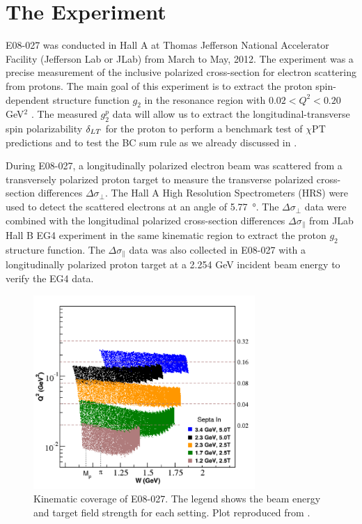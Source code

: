 
\chapter{The Experiment}
\label{C5}

E08-027 was conducted in Hall A at Thomas Jefferson National Accelerator Facility (Jefferson Lab or JLab) from March to May, 2012. The experiment was a precise measurement of the inclusive polarized cross-section for electron scattering from protons. The main goal of this experiment is to extract the proton spin-dependent structure function $g_2$ in the resonance region with $0.02<Q^2<0.20$ GeV${}^2$ \cite{G2P}. The measured $g_2^p$ data will allow us to extract the longitudinal-transverse spin polarizability $\delta_{LT}$ for the proton to perform a benchmark test of $\chi$PT predictions and to test the BC sum rule as we already discussed in .

During E08-027, a longitudinally polarized electron beam was scattered from a transversely polarized proton target to measure the transverse polarized cross-section differences $\Delta\sigma_\perp$. The Hall A High Resolution Spectrometers (HRS) were used to detect the scattered electrons at an angle of \SI{5.77}{\degree}. The $\Delta\sigma_\perp$ data were combined with the longitudinal polarized cross-section differences $\Delta\sigma_\parallel$ from JLab Hall B EG4 experiment \cite{EG4} in the same kinematic region to extract the proton $g_2$ structure function. The $\Delta\sigma_\parallel$ data was also collected in E08-027 with a longitudinally polarized proton target at a 2.254 GeV incident beam energy to verify the EG4 data.

\begin{figure}[tb!]
  \centering
  \includegraphics[width=0.75\textwidth]{figs/kinematics-g2p.png}
  \caption[Kinematic coverage of E08-027.]{Kinematic coverage of E08-027. The legend shows the beam energy and target field strength for each setting. Plot reproduced from \cite{G2P}. \label{C5F1}}
\end{figure}

